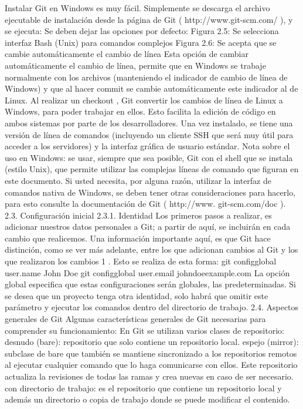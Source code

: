 \documentclass[12pt, spanish, oneside, onecolumn, a4paper]{report}
\begin{document}
Instalar Git en Windows es muy fácil. Simplemente se descarga el archivo ejecutable de instalación desde la página de Git ( http://www.git-scm.com/ ), y se ejecuta:
 Se deben dejar las opciones por defecto:
Figura 2.5: Se selecciona interfaz Bash (Unix) para comandos complejos
Figura 2.6: Se acepta que se cambie automáticamente el cambio de línea
Esta opción de cambiar automáticamente el cambio de línea, permite que en Windows se trabaje normalmente con los archivos (manteniendo el indicador de cambio de línea de Windows) y que al hacer commit se cambie automáticamente este indicador al de Linux. Al realizar un checkout , Git convertir los cambios de línea de Linux a Windows, para poder trabajar en ellos. Esto facilita la edición de código en ambos sistemas por parte de los desarrolladores.
 Una vez instalado, se tiene una versión de línea de comandos (incluyendo un cliente SSH que será muy útil para acceder a los servidores) y la interfaz gráfica de usuario estándar.
Nota sobre el uso en Windows: se usar, siempre que sea posible, Git con el shell que se instala (estilo Unix), que permite utilizar las complejas líneas de comando que figuran en este documento. Si usted necesita, por alguna razón, utilizar la interfaz de comandos nativa de Windows, se deben tener otras consideraciones para hacerlo, para esto consulte la documentación de Git ( http://www. git-scm.com/doc ).
 2.3. Configuración inicial
2.3.1. Identidad
Los primeros pasos a realizar, es adicionar nuestros datos personales a Git; a partir de aquí, se incluirán en cada cambio que realicemos. Una información importante aquí, es que Git hace distinción, como se ver más adelante, entre los que adicionan cambios al Git y los que realizaron los cambios 1 .
Esto se realiza de esta forma:
 git configglobal user.name John Doe
 git configglobal user.email johndoeexample.com
La opción  global  especifica que estas configuraciones serán globales, las predeterminadas. Si se desea que un proyecto tenga otra identidad, solo habrá que omitir este parámetro y ejecutar los comandos dentro del directorio de trabajo.
2.4. Aspectos generales de Git
Algunas características generales de Git necesarias para comprender su funcionamiento:
En Git se utilizan varios clases de repositorio:
desnudo (bare): repositorio que solo contiene un repositorio local.
espejo (mirror): subclase de bare que también se mantiene sincronizado a los repositorios remotos al ejecutar cualquier comando que lo haga comunicarse con ellos. Este repositorio actualiza la revisiones de todas las ramas y crea nuevas en caso de ser necesario.
con directorio de trabajo: es el repositorio que contiene un repositorio local y además un directorio o copia de trabajo donde se puede modificar el contenido.
\end{document}

